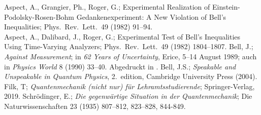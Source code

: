 \begin{thebibliography}{99}
 Aspect, A., Grangier, Ph., Roger, G.; 
       {Experimental Realization of Einstein-Podolsky-Rosen-Bohm 
        Gedankenexperiment: A New Violation of Bell's Inequalities}; 
        Phys.\ Rev.\ Lett.\ 49 (1982) 91--94. \\
        Aspect, A., Dalibard, J., Roger, G.; {Experimental Test 
        of Bell's Inequalities Using Time-Varying Analyzers}; 
        Phys.\ Rev.\ Lett.\ 49 (1982) 1804--1807.
 Bell, J.; {\em Against \glq Measurement\grq};
        in {\em 62 Years of Uncertainty}, Erice, 5--14 August 1989;
        auch in {\em Physics World} 8 (1990) 33--40. Abgedruckt in
        \cite{Bell2}. 
 Bell, J.S.;  {\em Speakable and Unspeakable in 
        Quantum Physics}, 2.\ edition, Cambridge University Press (2004).         
 Filk, T; \textit{Quantenmechanik (nicht nur) f\"ur Lehramtsstudierende}; Springer-Verlag, 2019.
 Schr\"odinger, E.; {\em Die gegenw\"artige
        Situation in der Quantenmechanik}; Die Naturwissenschaften 23
        (1935) 807--812, 823--828,  844-849.      
\end{thebibliography}

%


